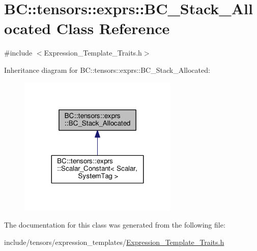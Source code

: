 \hypertarget{classBC_1_1tensors_1_1exprs_1_1BC__Stack__Allocated}{}\section{BC\+:\+:tensors\+:\+:exprs\+:\+:B\+C\+\_\+\+Stack\+\_\+\+Allocated Class Reference}
\label{classBC_1_1tensors_1_1exprs_1_1BC__Stack__Allocated}


{\ttfamily \#include $<$Expression\+\_\+\+Template\+\_\+\+Traits.\+h$>$}



Inheritance diagram for BC\+:\+:tensors\+:\+:exprs\+:\+:B\+C\+\_\+\+Stack\+\_\+\+Allocated\+:
\nopagebreak
\begin{figure}[H]
\begin{center}
\leavevmode
\includegraphics[width=215pt]{classBC_1_1tensors_1_1exprs_1_1BC__Stack__Allocated__inherit__graph}
\end{center}
\end{figure}


The documentation for this class was generated from the following file\+:\begin{DoxyCompactItemize}
\item 
include/tensors/expression\+\_\+templates/\hyperlink{Expression__Template__Traits_8h}{Expression\+\_\+\+Template\+\_\+\+Traits.\+h}\end{DoxyCompactItemize}
